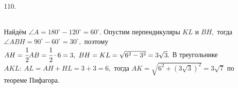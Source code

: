 110. \begin{figure}[ht!]
\end{figure}\\
Найдём $\angle A=180^\circ-120^\circ=60^\circ.$ Опустим перпендикуляры $KL$ и $BH,$ тогда $\angle ABH=90^\circ-60^\circ=30^\circ,$ поэтому $AH=\cfrac{1}{2}AB=\cfrac{1}{2}\cdot6=3,\ BH=KL=\sqrt{6^2-3^2}=3\sqrt{3}.$ В треугольнике $AKL:\ AL=AH+HL=3+3=6,$ тогда $AK=\sqrt{6^2+(3\sqrt{3})^2}=3\sqrt{7}$ по теореме Пифагора.\\
